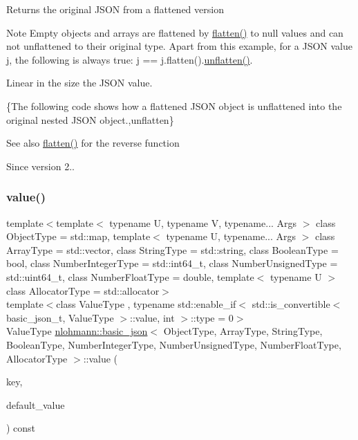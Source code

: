 \begin{DoxyReturn}{Returns}
the original J\+S\+ON from a flattened version
\end{DoxyReturn}
\begin{DoxyNote}{Note}
Empty objects and arrays are flattened by \hyperlink{classnlohmann_1_1basic__json_a54d58e56e8a67aaf0c2f3a3a05a76bba}{flatten()} to {\ttfamily null} values and can not unflattened to their original type. Apart from this example, for a J\+S\+ON value {\ttfamily j}, the following is always true\+: {\ttfamily j == j.\+flatten().\hyperlink{classnlohmann_1_1basic__json_abc459edfac71c4ecc9347731f722026b}{unflatten()}}.
\end{DoxyNote}
Linear in the size the J\+S\+ON value.

\{The following code shows how a flattened J\+S\+ON object is unflattened into the original nested J\+S\+ON object.,unflatten\}

\begin{DoxySeeAlso}{See also}
\hyperlink{classnlohmann_1_1basic__json_a54d58e56e8a67aaf0c2f3a3a05a76bba}{flatten()} for the reverse function
\end{DoxySeeAlso}
\begin{DoxySince}{Since}
version 2.. 
\end{DoxySince}
\hypertarget{classnlohmann_1_1basic__json_a407e73a037e6e3067ef7aa2c25a79f39}{}\label{classnlohmann_1_1basic__json_a407e73a037e6e3067ef7aa2c25a79f39} 
\subsubsection{\texorpdfstring{value()}{value()}\hspace{0.1cm}{\footnotesize\ttfamily [1/4]}}
{\footnotesize\ttfamily template$<$template$<$ typename U, typename V, typename... Args $>$ class Object\+Type = std\+::map, template$<$ typename U, typename... Args $>$ class Array\+Type = std\+::vector, class String\+Type  = std\+::string, class Boolean\+Type  = bool, class Number\+Integer\+Type  = std\+::int64\+\_\+t, class Number\+Unsigned\+Type  = std\+::uint64\+\_\+t, class Number\+Float\+Type  = double, template$<$ typename U $>$ class Allocator\+Type = std\+::allocator$>$ \\
template$<$class Value\+Type , typename std\+::enable\+\_\+if$<$ std\+::is\+\_\+convertible$<$ basic\+\_\+json\+\_\+t, Value\+Type $>$\+::value, int $>$\+::type  = 0$>$ \\
Value\+Type \hyperlink{classnlohmann_1_1basic__json}{nlohmann\+::basic\+\_\+json}$<$ Object\+Type, Array\+Type, String\+Type, Boolean\+Type, Number\+Integer\+Type, Number\+Unsigned\+Type, Number\+Float\+Type, Allocator\+Type $>$\+::value (\begin{DoxyParamCaption}\item[{const typename object\+\_\+t\+::key\+\_\+type \&}]{key,  }\item[{Value\+Type}]{default\+\_\+value }\end{DoxyParamCaption}) const\hspace{0.3cm}{\ttfamily [inline]}}



